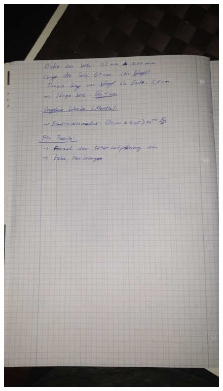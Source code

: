 \begin{figure}
    \centering
    \includegraphics[scale=0.1]{content/Bilder/daten4.jpg}
\end{figure}